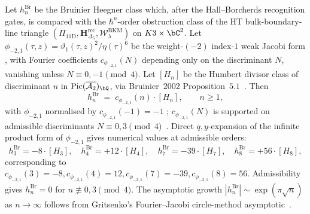 \begin{theorem}
\label{thm:htbb-heegner-all-order}
Let $h_n^{\mathrm{Br}}$ be the Bruinier Heegner class which, after the
Hall--Borcherds recognition gates, is compared with the $\hbar^n$-order
obstruction class of the HT bulk-boundary-line triangle
$(\Pi_{11\mathrm D}, \mathbf{H}_{\Delta_5}^{\mathrm{rec}},
\mathcal{W}^{\mathrm{BKM}}_\lambda)$ on $K3\times\bC^2$. Let
$\phi_{-2,1}(\tau, z) =
\vartheta_1(\tau, z)^2/\eta(\tau)^6$ be the weight-$(-2)$ index-$1$
weak Jacobi form \cite[\S 9, Theorem 9.3]{EichlerZagier1985}, with
Fourier coefficients $c_{\phi_{-2,1}}(N)$ depending only on the
discriminant $N$, vanishing unless $N\equiv 0, -1\pmod 4$. Let $[H_n]$
be the Humbert divisor class of discriminant $n$ in
$\mathrm{Pic}(\overline{\mathcal{A}_2})_\bQ$, via
Bruinier~$2002$ Proposition~$5.1$~\cite{Bruinier2002}. Then
\begin{equation}\label{eq:htbb-heegner-identity}
 h_n^{\mathrm{Br}} \;=\; c_{\phi_{-2,1}}(n)\cdot [H_n], \qquad n\geq 1,
\end{equation}
with $\phi_{-2,1}$ normalised by $c_{\phi_{-2,1}}(-1) = -1$
\cite[\S 9]{EichlerZagier1985}; $c_{\phi_{-2,1}}(N)$ is supported on
admissible discriminants $N\equiv 0, 3\pmod 4$~\cite[Theorem 9.3]{EichlerZagier1985}.
Direct $q, y$-expansion of the infinite product form of $\phi_{-2,1}$
gives numerical values at admissible orders:
\[
 h_3^{\mathrm{Br}} = -8\cdot[H_3], \quad
 h_4^{\mathrm{Br}} = +12\cdot[H_4], \quad
 h_7^{\mathrm{Br}} = -39\cdot[H_7], \quad
 h_8^{\mathrm{Br}} = +56\cdot[H_8],
\]
corresponding to $c_{\phi_{-2,1}}(3) = -8, c_{\phi_{-2,1}}(4) = 12,
c_{\phi_{-2,1}}(7) = -39, c_{\phi_{-2,1}}(8) = 56$.
Admissibility gives $h_n^{\mathrm{Br}} = 0$ for $n\not\equiv 0, 3
\pmod 4$. The asymptotic growth $|h_n^{\mathrm{Br}}| \sim
\exp(\pi\sqrt{n})$ as $n\to\infty$ follows from Gritsenko's
Fourier--Jacobi circle-method asymptotic~\cite[\S 2]{Gritsenko1999}.
\end{theorem}

